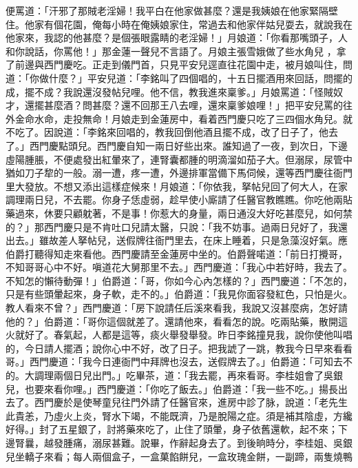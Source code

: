 便罵道：「汗邪了那賊老淫婦！我平白在他家做甚麼？還是我姨娘在他家緊隔壁住。他家有個花園，俺每小時在俺姨娘家住，常過去和他家伴姑兒耍去，就說我在他家來，我認的他甚麼？是個張眼露睛的老淫婦！」月娘道：「你看那嘴頭子，人和你說話，你罵他！」那金蓮一聲兒不言語了。月娘主張雪娥做了些水角兒 ，拿了前邊與西門慶吃。正走到儀門首，只見平安兒逕直往花園中走，被月娘叫住，問道：「你做什麼？」平安兒道：「李銘叫了四個唱的，十五日擺酒用來回話，問擺的成，擺不成？我說還沒發帖兒哩。他不信，教我進來稟爹。」月娘罵道：「怪賊奴才，還擺甚麼酒？問甚麼？還不回那王八去哩，還來稟爹娘哩！」把平安兒罵的往外金命水命，走投無命！月娘走到金蓮房中，看着西門慶只吃了三四個水角兒。就不吃了。因說道：「李銘來回唱的，教我回倒他酒且擺不成，改了日子了，他去了。」西門慶點頭兒。西門慶自知一兩日好些出來。誰知過了一夜，到次日，下邊虛陽腫脹，不便處發出紅暈來了，連腎囊都腫的明滴溜如茄子大。但溺尿，尿管中猶如刀子犂的一般。溺一遭，疼一遭，外邊排軍當備下馬伺候，還等西門慶往衙門里大發放。不想又添出這樣症候來！月娘道：「你依我，拏帖兒回了何大人，在家調理兩日兒，不去罷。你身子恁虛弱，趁早使小廝請了任醫官教瞧瞧。你吃他兩貼藥過來，休要只顧躭著，不是事！你惹大的身量，兩日通沒大好吃甚麼兒，如何禁的？」那西門慶只是不肯吐口兒請太醫，只說：「我不妨事。過兩日兒好了，我還出去。」雖故差人拏帖兒，送假牌往衙門里去，在床上睡着，只是急藻沒好氣。應伯爵打聽得知走來看他。西門慶請至金蓮房中坐的。伯爵聲喏道：「前日打攪哥，不知哥哥心中不好。嗔道花大舅那里不去。」西門慶道：「我心中若好時，我去了。不知怎的懶待動彈！」伯爵道：「哥，你如今心內怎樣的？」西門慶道：「不怎的，只是有些頭暈起來，身子軟，走不的。」伯爵道：「我見你面容發紅色，只怕是火。教人看來不曾？」西門慶道：「房下說請任后溪來看我，我說又沒甚麼病，怎好請他的？」伯爵道：「哥你這個就差了。還請他來，看看怎的說。吃兩貼藥，散開這火就好了。春氣起，人都是這等，痰火舉發舉發。昨日李銘撞見我，說你使他叫唱的，今日請人擺酒；說你心中不好，改了日子。把我諕了一跳，教我今日早來看看哥。」西門慶道：「我今日連衙門中拜牌也沒去，送假牌去了。」伯爵道：「可知去不的。大調理兩個日兒出門。」吃畢茶，道：「我去罷，再來看哥。李桂姐會了吳銀兒，也要來看你哩。」西門慶道：「你吃了飯去。」伯爵道：「我一些不吃。」揚長出去了。西門慶於是使琴童兒往門外請了任醫官來，進房中診了脉，說道：「老先生此貴恙，乃虛火上炎，腎水下竭，不能既濟，乃是脫陽之症。須是補其陰虛，方纔好得。」封了五星銀了，討將藥來吃了，止住了頭暈，身子依舊還軟，起不來；下邊腎曩，越發腫痛，溺尿甚難。說畢，作辭起身去了。到後晌時分，李桂姐、吳銀兒坐轎子來看；每人兩個盒子，一盒菓餡餅兒，一盒玫瑰金餅，一副蹄，兩隻燒鴨 
